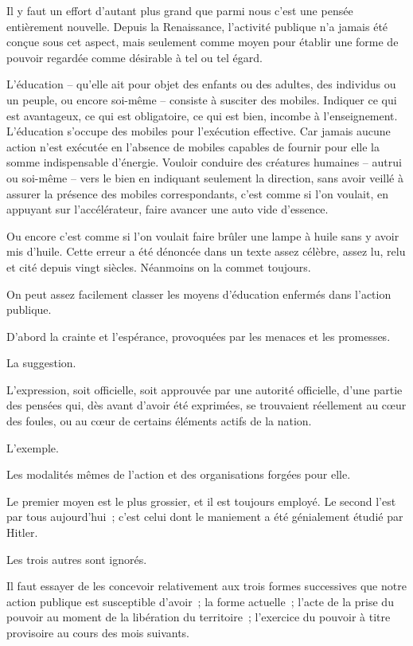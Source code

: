 \documentclass[french,twoside]{book} %
\begin{document}
Il y faut un effort d'autant plus grand que parmi nous c'est une pensée entièrement nouvelle. Depuis la Renaissance, l'activité publique n'a jamais été conçue sous cet aspect, mais seulement comme moyen pour établir une forme de pouvoir regardée comme désirable à tel ou tel égard.\par
L'éducation – qu'elle ait pour objet des enfants ou des adultes, des individus ou un peuple, ou encore soi-même – consiste à susciter des mobiles. Indiquer ce qui est avantageux, ce qui est obligatoire, ce qui est bien, incombe à l'enseignement. L'éducation s'occupe des mobiles pour l'exécution effective. Car jamais aucune action n'est exécutée en l'absence de mobiles capables de fournir pour elle la somme indispensable d'énergie. Vouloir conduire des créatures humaines – autrui ou soi-même – vers le bien en indiquant seulement la direction, sans avoir veillé à assurer la présence des mobiles correspondants, c'est comme si l'on voulait, en appuyant sur l'accélérateur, faire avancer une auto vide d'essence.\par
Ou encore c'est comme si l'on voulait faire brûler une lampe à huile sans y avoir mis d'huile. Cette erreur a été dénoncée dans un texte assez célèbre, assez lu, relu et cité depuis vingt siècles. Néanmoins on la commet toujours.\par
On peut assez facilement classer les moyens d'éducation enfermés dans l'action publique.\par
D'abord la crainte et l'espérance, provoquées par les menaces et les promesses.\par
La suggestion.\par
L'expression, soit officielle, soit approuvée par une autorité officielle, d'une partie des pensées qui, dès avant d'avoir été exprimées, se trouvaient réellement au cœur des foules, ou au cœur de certains éléments actifs de la nation.\par
L'exemple.\par
Les modalités mêmes de l'action et des organisations forgées pour elle.\par
Le premier moyen est le plus grossier, et il est toujours employé. Le second l'est par tous aujourd'hui ; c'est celui dont le maniement a été génialement étudié par Hitler.\par
\par
Les trois autres sont ignorés.\par
Il faut essayer de les concevoir relativement aux trois formes successives que notre action publique est susceptible d'avoir ; la forme actuelle ; l'acte de la prise du pouvoir au moment de la libération du territoire ; l'exercice du pouvoir à titre provisoire au cours des mois suivants.\par
\end{document}
